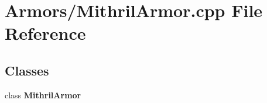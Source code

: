 \section{Armors/\-Mithril\-Armor.cpp File Reference}
\label{_mithril_armor_8cpp}
\subsection*{Classes}
\begin{DoxyCompactItemize}
\item 
class {\bf Mithril\-Armor}
\end{DoxyCompactItemize}
